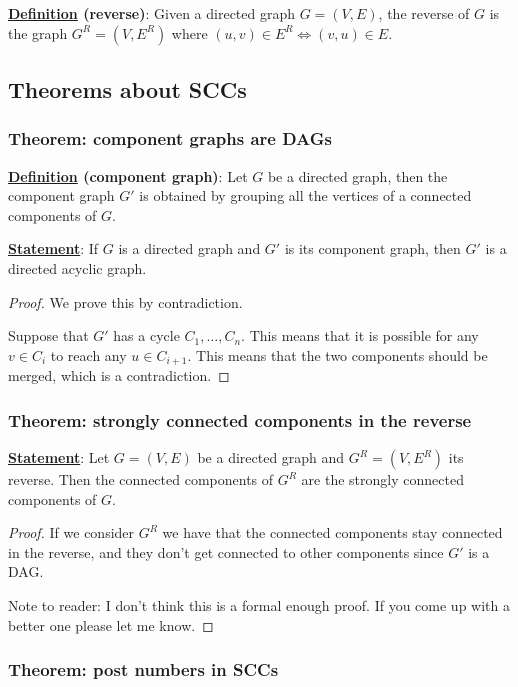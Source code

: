 \documentclass[12pt]{extarticle}
\begin{document}
\textbf{\underline{Definition} (reverse)}: Given a directed graph $G=(V, E)$,
the reverse of $G$ is the graph $G^R = (V, E^R)$ where $(u, v) \in E^R \iff (v,u) \in E$.

\subsection{Theorems about SCCs}

\subsubsection{Theorem: component graphs are DAGs}

\textbf{\underline{Definition} (component graph)}:
Let $G$ be a directed graph, then the component graph $G'$ is obtained by grouping all the vertices of a connected components of $G$.

\textbf{\underline{Statement}}: If $G$ is a directed graph and $G'$ is its component graph, then $G'$ is a directed acyclic graph.

\begin{proof}
    We prove this by contradiction.

    Suppose that $G'$ has a cycle $C_1, \ldots, C_n$.
    This means that it is possible for any $v \in C_i$ to reach any $u \in C_{i+1}$.
    This means that the two components should be merged, which is a contradiction.
\end{proof}

\subsubsection{Theorem: strongly connected components in the reverse}

\textbf{\underline{Statement}}: Let $G = (V, E)$ be a directed graph and $G^R = (V, E^R)$ its reverse.
Then the connected components of $G^R$ are the strongly connected components of $G$.

\begin{proof}
    If we consider $G^R$ we have that the connected components stay connected in the reverse, and they don't get connected to other components since $G'$ is a DAG.

    Note to reader: I don't think this is a formal enough proof. If you come up with a better one please let me know.
\end{proof}

\subsubsection{Theorem: post numbers in SCCs}
\end{document}
